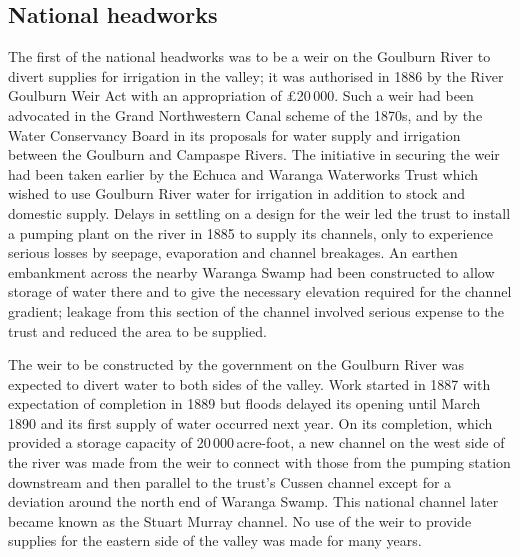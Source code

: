 \subsection*{National headworks}

The first of the national headworks was to be a weir on the Goulburn
River to divert supplies for irrigation in the valley; it was
authorised in 1886 by the River Goulburn Weir Act with an
appropriation of \pounds20\,000.  Such a weir had been advocated in the
Grand Northwestern Canal scheme of the 1870s, and by the Water
Conservancy Board in its proposals for water supply and irrigation
between the Goulburn and Campaspe Rivers.  The initiative in securing
the weir had been taken earlier by the Echuca and Waranga Waterworks
Trust which wished to use Goulburn River water for irrigation in
addition to stock and domestic supply.  Delays in settling on a design
for the weir led the trust to install a pumping plant on the river in
1885 to supply its channels, only to experience serious losses by
seepage, evaporation and channel breakages.  An earthen embankment
across the nearby Waranga Swamp had been constructed to allow storage
of water there and to give the necessary elevation required for the
channel gradient; leakage from this section of the channel involved
serious expense to the trust and reduced the area to be
supplied.

The weir to be constructed by the government on the Goulburn River was
expected to divert water to both sides of the valley.  Work started in 1887 with expectation of
completion in 1889 but floods delayed its opening until March 1890 and
its first supply of water occurred next year.  On its completion,
which provided a storage capacity of 20\,000\,acre-foot, a new channel
on the west side of the river was made from the weir to connect with
those from the pumping station downstream and then parallel to the
trust's Cussen channel except for a deviation around the north end of
Waranga Swamp.  This
national channel later became known as the Stuart Murray channel.  No
use of the weir to provide supplies for the eastern side of the valley
was made for many years.

